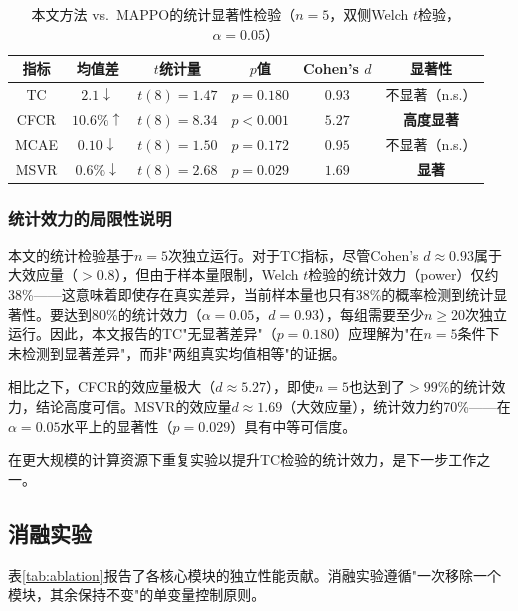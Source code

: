 \documentclass[12pt,a4paper,UTF8]{ctexart}
\begin{document}
\begin{table}[H]
    \centering
    \caption{本文方法 vs.\ MAPPO的统计显著性检验（$n=5$，双侧Welch $t$检验，$\alpha=0.05$）}
    \label{tab:statistical_tests}
    \begin{tabular}{|c|c|c|c|c|c|}
        \hline
        \textbf{指标} & \textbf{均值差} & \textbf{$t$统计量} & \textbf{$p$值} & \textbf{Cohen's $d$} & \textbf{显著性} \\
        \hline
        TC & $2.1 \downarrow$ & $t(8)=1.47$ & $p=0.180$ & $0.93$ & 不显著（n.s.） \\
        CFCR & $10.6\% \uparrow$ & $t(8)=8.34$ & $p<0.001$ & $5.27$ & \textbf{高度显著} \\
        MCAE & $0.10 \downarrow$ & $t(8)=1.50$ & $p=0.172$ & $0.95$ & 不显著（n.s.） \\
        MSVR & $0.6\% \downarrow$ & $t(8)=2.68$ & $p=0.029$ & $1.69$ & \textbf{显著} \\
        \hline
    \end{tabular}
\end{table}

\subsubsection{统计效力的局限性说明}

本文的统计检验基于$n=5$次独立运行。对于TC指标，尽管Cohen's $d \approx 0.93$属于大效应量（$>0.8$），但由于样本量限制，Welch $t$检验的统计效力（power）仅约38\%——这意味着即使存在真实差异，当前样本量也只有38\%的概率检测到统计显著性。要达到80\%的统计效力（$\alpha=0.05$，$d=0.93$），每组需要至少$n \geq 20$次独立运行。因此，本文报告的TC"无显著差异"（$p=0.180$）应理解为"在$n=5$条件下未检测到显著差异"，而非"两组真实均值相等"的证据。

相比之下，CFCR的效应量极大（$d \approx 5.27$），即使$n=5$也达到了$>99\%$的统计效力，结论高度可信。MSVR的效应量$d \approx 1.69$（大效应量），统计效力约70\%——在$\alpha=0.05$水平上的显著性（$p=0.029$）具有中等可信度。

在更大规模的计算资源下重复实验以提升TC检验的统计效力，是下一步工作之一。

\subsection{消融实验}

表\ref{tab:ablation}报告了各核心模块的独立性能贡献。消融实验遵循"一次移除一个模块，其余保持不变"的单变量控制原则。
\end{document}
